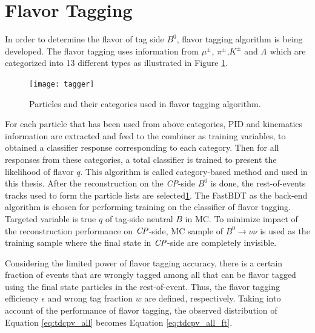 \section{Flavor Tagging}
 In order to determine the flavor of tag side $B^0$, flavor tagging algorithm is being developed. The flavor tagging uses information from $\mu^{\pm}$, $\pi^{\pm}$,$K^{\pm}$ and $\Lambda^{}$ which are categorized into 13 different types as illustrated in Figure \ref{fig:flavortagger}. 

\begin{figure}[H]
\centering
\texttt{[image: tagger]}
\caption{Particles and their categories used in flavor tagging algorithm\cite{flavortagger}.}
\label{fig:flavortagger}
\end{figure}
 
 
For each particle that has been used from above categories, PID and kinematics information are extracted and feed to the combiner as training variables, to obtained a classifier response corresponding to each category. Then for all responses from these categories, a total classifier is trained to present the likelihood of flavor $q$. This algorithm is called category-based method and used in this thesis. After the reconstruction on the \textit{CP}-side $B^0$ is done, the rest-of-events tracks used to form the particle lists are selected\ref{fig:flavortagger}. The FastBDT as the back-end algorithm is chosen for performing training on the classifier of flavor tagging. Targeted variable is true $q$ of tag-side neutral $B$ in MC. To minimize impact of the reconstruction performance on $\it{CP}$-side, MC sample of $B^0 \to \nu \nu$ is used as the training sample where the final state in $\it{CP}$-side are completely invisible. 

Considering the limited power of flavor tagging accuracy, there is a certain fraction of events that are wrongly tagged among all that can be flavor tagged using the final state particles in the rest-of-event. Thus, the flavor tagging efficiency $\epsilon$ and wrong tag fraction $w$ are defined, respectively. Taking into account of the performance of flavor tagging, the observed distribution of Equation \ref{eq:tdcpv_all} becomes Equation \ref{eq:tdcpv_all_ft}.

